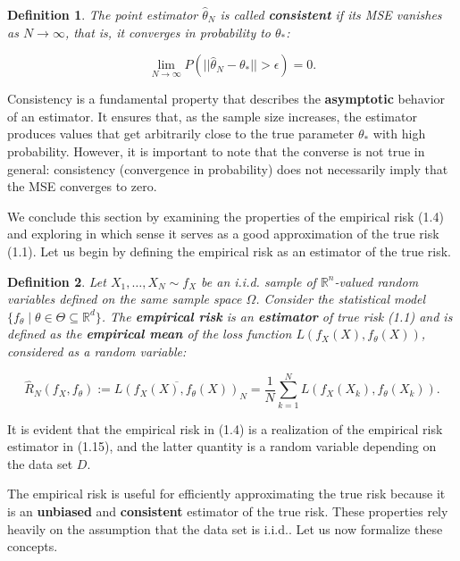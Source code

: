\documentclass{report}
\newtheorem{definition}{Definition}[chapter]
\begin{document}
\begin{definition}
The point estimator $\hat{\theta}_N$ is called \textbf{consistent} if its MSE vanishes as $N \to \infty$, that is, it converges in probability to $\theta_*$:

\begin{equation}
\lim_{N \to \infty} P(||\hat{\theta}_N -\theta_*|| > \epsilon) = 0.
\end{equation}
\end{definition}
Consistency is a fundamental property that describes the \textbf{asymptotic} behavior of an estimator. It ensures that, as the sample size increases, the estimator produces values that get arbitrarily close to the true parameter $\theta_*$ with high probability. However, it is important to note that the converse is not true in general: consistency (convergence in probability) does not necessarily imply that the MSE converges to zero.

We conclude this section by examining the properties of the empirical risk (1.4) and exploring in which sense it serves as a good approximation of the true risk (1.1). Let us begin by defining the empirical risk as an estimator of the true risk.

\begin{definition}
Let $X_1,\dots,X_N \sim f_X$ be an i.i.d. sample of $\mathbb{R}^n$-valued random variables defined on the same sample space $\Omega$. Consider the statistical model $\{f_\theta \mid \theta \in \Theta \subseteq \mathbb{R}^d\}$. The \textbf{empirical risk} is an \textbf{estimator} of true risk (1.1) and is defined as the \textbf{empirical mean} of the loss function $L(f_X(X), f_\theta(X))$, considered as a random variable:

\begin{equation}
\hat{R}_N(f_X,f_\theta) := \overline{L(f_X(X),f_\theta(X))}_N = \frac{1}{N}\sum_{k=1}^{N}L(f_X(X_k),f_\theta(X_k)).
\end{equation}
\end{definition}
It is evident that the empirical risk in (1.4) is a realization of the empirical risk estimator in (1.15), and the latter quantity is a random variable depending on the data set $D$.

The empirical risk is useful for efficiently approximating the true risk because it is an \textbf{unbiased} and \textbf{consistent} estimator of the true risk. These properties rely heavily on the assumption that the data set is i.i.d.. Let us now formalize these concepts.
\end{document}
